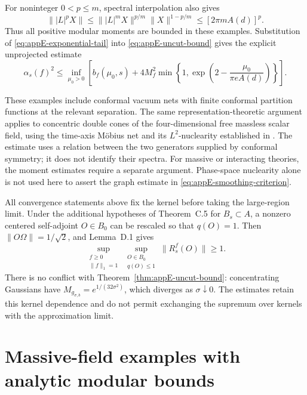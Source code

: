 \documentclass[a4paper,11pt]{article}
\theoremstyle{definition}
\begin{document}
For noninteger $0<p\le m$, spectral interpolation also gives
\[
 \||L|^pX\|\le\||L|^mX\|^{p/m}\|X\|^{1-p/m}
 \le[2\pi mA(d)]^p.
\]
Thus all positive modular moments are bounded in these examples. Substitution of \eqref{eq:appE-exponential-tail} into \eqref{eq:appE-uncut-bound} gives the explicit unprojected estimate
\begin{equation}
 \alpha_s(f)^2\le\inf_{\mu_0>0}
 \left[b_f(\mu_0,s)+4M_f^2
 \min\left\{1,\exp\left(2-\frac{\mu_0}{\pi eA(d)}\right)\right\}\right].
 \label{eq:appE-conformal-uncut-bound}
\end{equation}

These examples include conformal vacuum nets with finite conformal partition functions at the relevant separation. The same representation-theoretic argument applies to concentric double cones of the four-dimensional free massless scalar field, using the time-axis M\"obius net and its $L^2$-nuclearity established in \cite[Section~8.2 and Corollary~8.5]{BDL2007}. The estimate uses a relation between the two generators supplied by conformal symmetry; it does not identify their spectra. For massive or interacting theories, the moment estimates require a separate argument. Phase-space nuclearity alone is not used here to assert the graph estimate in \eqref{eq:appE-smoothing-criterion}.

All convergence statements above fix the kernel before taking the large-region limit. Under the additional hypotheses of Theorem~C.5 for $B_s\subset A$, a nonzero centered self-adjoint $O\in B_0$ can be rescaled so that $q(O)=1$. Then $\|O\Omega\|=1/\sqrt2$, and Lemma~D.1 gives
\begin{equation}
 \sup_{\substack{f\ge0\\\|f\|_1=1}}
 \sup_{\substack{O\in B_0\\q(O)\le1}}\|R_s^f(O)\|\ge1.
 \label{eq:appE-kernel-uniform-obstruction}
\end{equation}
There is no conflict with Theorem~\ref{thm:appE-uncut-bound}: concentrating Gaussians have $M_{g_{\sigma,b}}=e^{1/(32\sigma^2)}$, which diverges as $\sigma\downarrow0$. The estimates retain this kernel dependence and do not permit exchanging the supremum over kernels with the approximation limit.

\section{Massive-field examples with analytic modular bounds}
\label{app:massive-examples}
\end{document}
